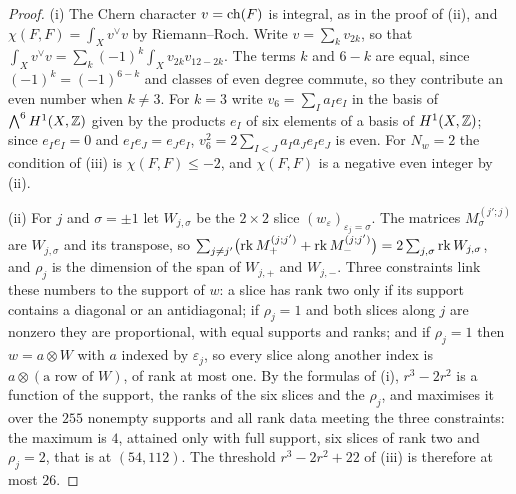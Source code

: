 \begin{proof}
(i) The Chern character $v=\operatorname{ch}(F)$ is integral, as in the proof of
(ii), and $\chi(F,F)=\int_{X}v^{\vee}v$ by
Riemann--Roch. Write $v=\sum_{k}v_{2k}$, so that
$\int_{X}v^{\vee}v=\sum_{k}(-1)^{k}\int_{X}v_{2k}v_{12-2k}$. The terms $k$ and
$6-k$ are equal, since $(-1)^{k}=(-1)^{6-k}$ and classes of even degree
commute, so they contribute an even number when $k\ne3$. For $k=3$ write
$v_{6}=\sum_{I}a_{I}e_{I}$ in the basis of $\bigwedge^{6}H^{1}(X,\mathbb{Z})$ given
by the products $e_{I}$ of six elements of a basis of $H^{1}(X,\mathbb{Z})$; since
$e_{I}e_{I}=0$ and $e_{I}e_{J}=e_{J}e_{I}$, $v_{6}^{2}=2\sum_{I<J}a_{I}a_{J}
e_{I}e_{J}$ is even. For $N_{w}=2$ the condition of
(iii) is $\chi(F,F)\le-2$, and $\chi(F,F)$ is a
negative even integer by (ii).

(ii) For $j$ and $\sigma=\pm1$ let $W_{j,\sigma}$ be the $2\times2$ slice
$(w_{\varepsilon})_{\varepsilon_{j}=\sigma}$. The matrices
$M^{(j';j)}_{\sigma}$ are $W_{j,\sigma}$ and its transpose, so
$\sum_{j\ne j'}\bigl(\operatorname{rk} M^{(j;j')}_{+}+\operatorname{rk} M^{(j;j')}_{-}\bigr)
=2\sum_{j,\sigma}\operatorname{rk} W_{j,\sigma}$, and $\rho_{j}$ is the dimension of the span
of $W_{j,+}$ and $W_{j,-}$. Three constraints link these numbers to the
support of $w$: a slice has rank two only if its support contains a diagonal
or an antidiagonal; if $\rho_{j}=1$ and both slices along $j$ are nonzero
they are proportional, with equal supports and ranks; and if $\rho_{j}=1$
then $w=a\otimes W$ with $a$ indexed by $\varepsilon_{j}$, so every slice along
another index is $a\otimes(\text{a row of }W)$, of rank at most one. By the
formulas of (i), $r^{3}-2r^{2}$ is a function of the
support, the ranks of the six slices and the $\rho_{j}$, and \cite{BMB26}
maximises it over the $255$ nonempty supports and all rank data meeting the
three constraints: the maximum is $4$, attained only with full support, six
slices of rank two and $\rho_{j}=2$, that is at $(54,112)$. The threshold
$r^{3}-2r^{2}+22$ of (iii) is therefore at most $26$.


\end{proof}
